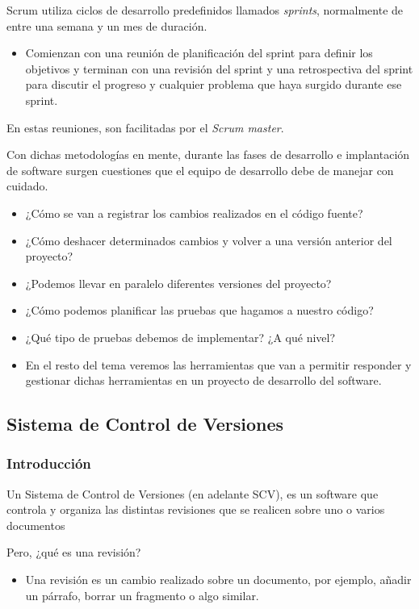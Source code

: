 Scrum utiliza ciclos de desarrollo predefinidos llamados \textit{sprints}, normalmente de entre una semana y un mes de duración.
\begin{itemize}
	\item Comienzan con una reunión de planificación del sprint para definir los objetivos y terminan con una revisión del sprint y una retrospectiva del sprint para discutir el progreso y cualquier problema que haya surgido durante ese sprint.
\end{itemize}
En estas reuniones, son facilitadas por el \textit{Scrum master}.

Con dichas metodologías en mente, durante las fases de desarrollo e implantación de software surgen cuestiones que el equipo de desarrollo debe de manejar con cuidado.
\begin{itemize}
	\item ¿Cómo se van a registrar los cambios realizados en el código fuente?
	\item ¿Cómo deshacer determinados cambios y volver a una versión anterior del proyecto?
	\item ¿Podemos llevar en paralelo diferentes versiones del proyecto?
	\item ¿Cómo podemos planificar las pruebas que hagamos a nuestro código?
	\item ¿Qué tipo de pruebas debemos de implementar? ¿A qué nivel?
	\item En el resto del tema veremos las herramientas que van a permitir responder y gestionar dichas herramientas en un proyecto de desarrollo del software.
\end{itemize}
\subsection{Sistema de Control de Versiones}
\subsubsection{Introducción}
Un Sistema de Control de Versiones (en adelante SCV), es un software que controla y organiza las distintas revisiones que se realicen sobre uno o varios documentos

Pero, ¿qué es una revisión?
\begin{itemize}
	\item Una revisión es un cambio realizado sobre un documento, por ejemplo, añadir un párrafo, borrar un fragmento o algo similar.
\end{itemize}

